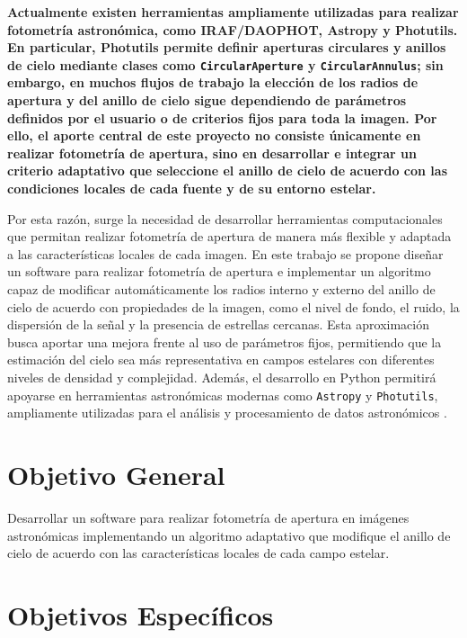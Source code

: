 \documentclass[9pt]{extarticle}
\begin{document}
\textbf{Actualmente existen herramientas ampliamente utilizadas para realizar fotometría astronómica, como IRAF/DAOPHOT, Astropy y Photutils. En particular, Photutils permite definir aperturas circulares y anillos de cielo mediante clases como \texttt{CircularAperture} y \texttt{CircularAnnulus}; sin embargo, en muchos flujos de trabajo la elección de los radios de apertura y del anillo de cielo sigue dependiendo de parámetros definidos por el usuario o de criterios fijos para toda la imagen. Por ello, el aporte central de este proyecto no consiste únicamente en realizar fotometría de apertura, sino en desarrollar e integrar un criterio adaptativo que seleccione el anillo de cielo de acuerdo con las condiciones locales de cada fuente y de su entorno estelar.}

Por esta razón, surge la necesidad de desarrollar herramientas computacionales que permitan realizar fotometría de apertura de manera más flexible y adaptada a las características locales de cada imagen. En este trabajo se propone diseñar un software para realizar fotometría de apertura e implementar un algoritmo capaz de modificar automáticamente los radios interno y externo del anillo de cielo de acuerdo con propiedades de la imagen, como el nivel de fondo, el ruido, la dispersión de la señal y la presencia de estrellas cercanas. Esta aproximación busca aportar una mejora frente al uso de parámetros fijos, permitiendo que la estimación del cielo sea más representativa en campos estelares con diferentes niveles de densidad y complejidad. Además, el desarrollo en Python permitirá apoyarse en herramientas astronómicas modernas como \texttt{Astropy} y \texttt{Photutils}, ampliamente utilizadas para el análisis y procesamiento de datos astronómicos \cite{astropy2013, astropy2022, bradley2024photutils}.

\section{Objetivo General}

Desarrollar un software para realizar fotometría de apertura en imágenes astronómicas implementando un algoritmo adaptativo que modifique el anillo de cielo de acuerdo con las características locales de cada campo estelar.

\section{Objetivos Específicos}
\end{document}
